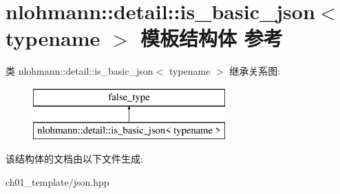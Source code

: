 \hypertarget{structnlohmann_1_1detail_1_1is__basic__json}{}\section{nlohmann\+::detail\+::is\+\_\+basic\+\_\+json$<$ typename $>$ 模板结构体 参考}
\label{structnlohmann_1_1detail_1_1is__basic__json}
类 nlohmann\+::detail\+::is\+\_\+basic\+\_\+json$<$ typename $>$ 继承关系图\+:\begin{figure}[H]
\begin{center}
\leavevmode
\includegraphics[height=2.000000cm]{structnlohmann_1_1detail_1_1is__basic__json}
\end{center}
\end{figure}


该结构体的文档由以下文件生成\+:\begin{DoxyCompactItemize}
\item 
ch01\+\_\+template/json.\+hpp\end{DoxyCompactItemize}
